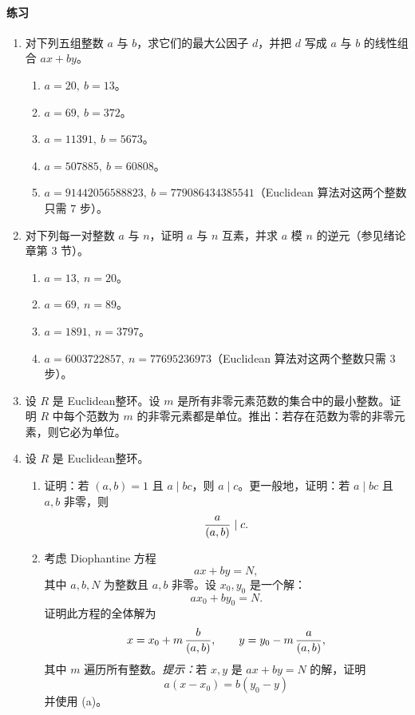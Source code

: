 \paragraph{练习}
\begin{enumerate}[label=\arabic*.]
	\item 对下列五组整数 $a$ 与 $b$，求它们的最大公因子 $d$，并把 $d$ 写成 $a$ 与 $b$ 的线性组合 $ax+by$。
	\begin{enumerate}[label=(\alph*)]
		\item $a=20,\ b=13$。
		\item $a=69,\ b=372$。
		\item $a=11391,\ b=5673$。
		\item $a=507885,\ b=60808$。
		\item $a=91442056588823,\ b=779086434385541$（Euclidean 算法对这两个整数只需 $7$ 步）。
	\end{enumerate}
	
	\item 对下列每一对整数 $a$ 与 $n$，证明 $a$ 与 $n$ 互素，并求 $a$ 模 $n$ 的逆元（参见绪论章第 3 节）。
	\begin{enumerate}[label=(\alph*)]
		\item $a=13,\ n=20$。
		\item $a=69,\ n=89$。
		\item $a=1891,\ n=3797$。
		\item $a=6003722857,\ n=77695236973$（Euclidean 算法对这两个整数只需 $3$ 步）。
	\end{enumerate}
	
	\item 设 $R$ 是 Euclidean整环。设 $m$ 是所有非零元素范数的集合中的最小整数。证明 $R$ 中每个范数为 $m$ 的非零元素都是单位。推出：若存在范数为零的非零元素，则它必为单位。
	
	\item 设 $R$ 是 Euclidean整环。
	\begin{enumerate}[label=(\alph*)]
		\item 证明：若 $(a,b)=1$ 且 $a\mid bc$，则 $a\mid c$。更一般地，证明：若 $a\mid bc$ 且 $a,b$ 非零，则
		\[
		{a\over (a,b)}\mid c.
		\]
		\item 考虑 Diophantine 方程
		\[
		ax+by=N,
		\]
		其中 $a,b,N$ 为整数且 $a,b$ 非零。设 $x_0,y_0$ 是一个解：
		\[
		ax_0+by_0=N.
		\]
		证明此方程的全体解为
		\[
		x=x_0+m\,{b\over (a,b)},\qquad
		y=y_0-m\,{a\over (a,b)},
		\]
		其中 $m$ 遍历所有整数。\emph{提示：}若 $x,y$ 是 $ax+by=N$ 的解，证明
		\[
		a(x-x_0)=b(y_0-y)
		\]
		并使用 (a)。
	\end{enumerate}
	

\end{enumerate}
